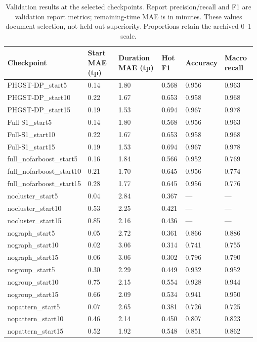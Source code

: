 \begin{table}[p]
\centering\scriptsize
\caption{Validation results at the selected checkpoints. Report precision/recall and F1 are validation report metrics; remaining-time MAE is in minutes. These values document selection, not held-out superiority. Proportions retain the archived 0--1 scale.}
\begin{tabularx}{\textwidth}{lXXXXX}
\toprule
Checkpoint & Start MAE (tp) & Duration MAE (tp) & Hot F1 & Accuracy & Macro recall \\
\midrule
PHGST-DP\_start5 & 0.14 & 1.80 & 0.568 & 0.956 & 0.963 \\
PHGST-DP\_start10 & 0.22 & 1.67 & 0.653 & 0.958 & 0.968 \\
PHGST-DP\_start15 & 0.19 & 1.53 & 0.694 & 0.967 & 0.978 \\
Full-S1\_start5 & 0.14 & 1.80 & 0.568 & 0.956 & 0.963 \\
Full-S1\_start10 & 0.22 & 1.67 & 0.653 & 0.958 & 0.968 \\
Full-S1\_start15 & 0.19 & 1.53 & 0.694 & 0.967 & 0.978 \\
full\_nofarboost\_start5 & 0.16 & 1.84 & 0.566 & 0.952 & 0.769 \\
full\_nofarboost\_start10 & 0.21 & 1.70 & 0.645 & 0.956 & 0.774 \\
full\_nofarboost\_start15 & 0.28 & 1.77 & 0.645 & 0.956 & 0.776 \\
nocluster\_start5 & 0.04 & 2.84 & 0.367 & --- & --- \\
nocluster\_start10 & 0.53 & 2.25 & 0.421 & --- & --- \\
nocluster\_start15 & 0.85 & 2.16 & 0.436 & --- & --- \\
nograph\_start5 & 0.05 & 2.72 & 0.361 & 0.866 & 0.886 \\
nograph\_start10 & 0.02 & 3.06 & 0.314 & 0.741 & 0.755 \\
nograph\_start15 & 0.06 & 3.06 & 0.302 & 0.796 & 0.790 \\
nogroup\_start5 & 0.30 & 2.29 & 0.449 & 0.932 & 0.952 \\
nogroup\_start10 & 0.75 & 2.15 & 0.554 & 0.928 & 0.944 \\
nogroup\_start15 & 0.66 & 2.09 & 0.534 & 0.941 & 0.950 \\
nopattern\_start5 & 0.07 & 2.65 & 0.381 & 0.726 & 0.725 \\
nopattern\_start10 & 0.46 & 2.14 & 0.450 & 0.807 & 0.823 \\
nopattern\_start15 & 0.52 & 1.92 & 0.548 & 0.851 & 0.862 \\

\end{tabularx}
\end{table}
